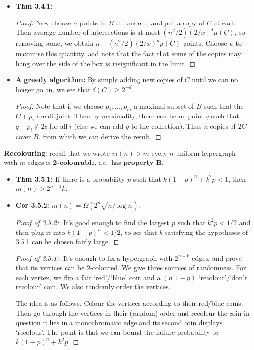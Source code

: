 \documentclass[11pt]{article}
\newenvironment{INT}[1][]{\begin{itemize}\small\item\textbf{#1}}{\end{itemize}}
\newcommand{\moreINT}[1][]{\item\textbf{#1}}
\begin{document}
\begin{chapter3}
\begin{itemise}
\begin{INT}[Thm 3.4.1:]
\begin{proof}
\INDENT Now choose $n$ points in $B$ at random, and put a copy of $C$ at each. Then average number of intersections is at most $(n^2/2)(2/x)^d\mu(C)$, so removing some, we obtain $n-(n^2/2)(2/x)^d\mu(C)$ points. Choose $n$ to maximise this quantity, and note that the fact that some of the copies may hang over the side of the box is insignificant in the limit.
\end{proof}
\moreINT[A greedy algorithm:] By simply adding new copies of $C$ until we can no longer go on, we see that $\delta(C)\geq 2^{-d}$.
\begin{proof}
Note that if we choose $p_1,\ldots,p_m$ a maximal subset of $B$ such that the $C+p_i$ are disjoint. Then by maximality, there can be no point $q$ such that $q-p_i\notin 2c$ for all $i$ (else we can add $q$ to the collection). Thus $n$ copies of $2C$ cover $B$, from which we can derive the result.
\end{proof}
\end{INT}
\item \textbf{Recolouring:}  recall that we wrote $m(n)>m$ \Iff every $n$-uniform hypergraph with $m$ edges is \textbf{2-colourable}, i.e.\ has \textbf{property B}.
\begin{INT}[Thm 3.5.1:]
If there is a probability $p$ such that $k(1-p)^n+k^2p<1$, then $m(n)>2^{n-1}k$.
\moreINT[Cor 3.5.2:] $m(n)=\Omega(2^n\sqrt{n/\log n})$.
\begin{proof}[Proof of 3.5.2:]
It's good enough to find the largest $p$ such that $k^2p<1/2$ and then plug it into $k(1-p)^n<1/2$, to see that $k$ satisfying the hypotheses of 3.5.1 can be chosen fairly large.
\end{proof}
\begin{proof}[Proof of 3.5.1:]
It's enough to fix a hypergraph with $2^{n-k}$ edges, and prove that its vertices can be 2-coloured.
We give three sources of randomness. For each vertex, we flip a fair `red'/`blue' coin and a $(p,1-p)$ `recolour'/`don't recolour' coin. We also randomly order the vertices.

\INDENT The idea is as follows. Colour the vertices according to their red/blue coins. Then go through the vertices in their (random) order and recolour the coin in question \Iff it lies in a monochromatic edge and its second coin displays `recolour'. The point is that we can bound the failure probability by $k(1-p)^n+k^2p$.
\end{proof}





\end{INT}
\end{itemise}
\end{chapter3}
\end{document}
